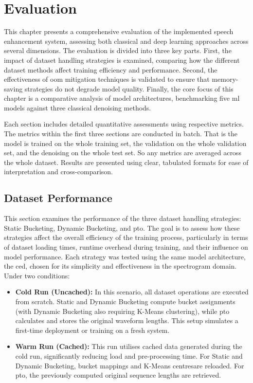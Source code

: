 \graphicspath{{content/chapters/7_evaluation/figures/}}
\chapter{Evaluation}
\label{chp:evaluation}

This chapter presents a comprehensive evaluation of the implemented speech enhancement system, assessing both classical and deep learning approaches across several dimensions. The evaluation is divided into three key parts. First, the impact of dataset handling strategies is examined, comparing how the different dataset methods affect training efficiency and performance. Second, the effectiveness of \gls{oom} mitigation techniques is validated to ensure that memory-saving strategies do not degrade model quality. Finally, the core focus of this chapter is a comparative analysis of model architectures, benchmarking five \gls{ml} models against three classical denoising methods.

Each section includes detailed quantitative assessments using respective metrics. The metrics within the first three sections are conducted in batch. That is the model is trained on the whole training set, the validation on the whole validation set, and the denoising on the whole test set. So any metrics are averaged across the whole dataset. Results are presented using clear, tabulated formats for ease of interpretation and cross-comparison.

\section{Dataset Performance}
\label{sec:dataset_performance}

This section examines the performance of the three dataset handling strategies: Static Bucketing, Dynamic Bucketing, and \gls{pto}. The goal is to assess how these strategies affect the overall efficiency of the training process, particularly in terms of dataset loading times, runtime overhead during training, and their influence on model performance. Each strategy was tested using the same model architecture, the \gls{ced}, chosen for its simplicity and effectiveness in the spectrogram domain. Under two conditions:

\begin{itemize}
    \item \textbf{Cold Run (Uncached):} In this scenario, all dataset operations are executed from scratch. Static and Dynamic Bucketing compute bucket assignments (with Dynamic Bucketing also requiring K-Means clustering), while \gls{pto} calculates and stores the original waveform lengths. This setup simulates a first-time deployment or training on a fresh system.
    
    \item \textbf{Warm Run (Cached):} This run utilises cached data generated during the cold run, significantly reducing load and pre-processing time. For Static and Dynamic Bucketing, bucket mappings and K-Means centresare reloaded. For \gls{pto}, the previously computed original sequence lengths are retrieved.
\end{itemize}

